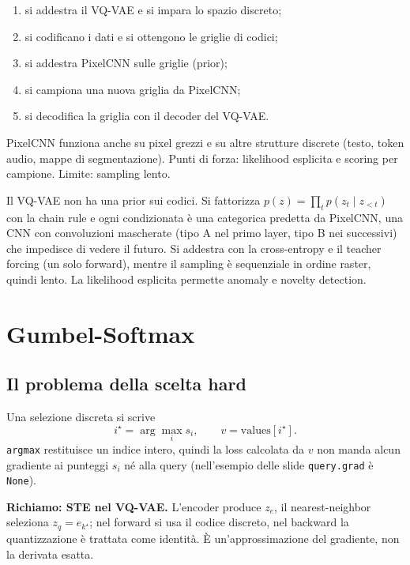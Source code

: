 \documentclass[11pt,a4paper]{article}
\begin{document}
\begin{enumerate}
  \item si addestra il VQ-VAE e si impara lo spazio discreto;
  \item si codificano i dati e si ottengono le griglie di codici;
  \item si addestra PixelCNN sulle griglie (prior);
  \item si campiona una nuova griglia da PixelCNN;
  \item si decodifica la griglia con il decoder del VQ-VAE.
\end{enumerate}

PixelCNN funziona anche su pixel grezzi e su altre strutture discrete (testo, token audio, mappe di segmentazione).
Punti di forza: likelihood esplicita e scoring per campione. Limite: sampling lento.

\begin{importante}
Il VQ-VAE non ha una prior sui codici. Si fattorizza $p(z)=\prod_t p(z_t\mid z_{<t})$ con la chain rule e ogni
condizionata è una categorica predetta da PixelCNN, una CNN con convoluzioni mascherate (tipo A nel primo layer,
tipo B nei successivi) che impedisce di vedere il futuro. Si addestra con la cross-entropy e il teacher forcing
(un solo forward), mentre il sampling è sequenziale in ordine raster, quindi lento. La likelihood esplicita permette anomaly e novelty detection.
\end{importante}

\section{Gumbel-Softmax}

\subsection{Il problema della scelta hard}
Una selezione discreta si scrive
\[
i^\star=\arg\max_i s_i,\qquad v=\mathrm{values}[i^\star].
\]
\texttt{argmax} restituisce un indice intero, quindi la loss calcolata da $v$ non manda alcun gradiente
ai punteggi $s_i$ né alla query (nell'esempio delle slide \texttt{query.grad} è \texttt{None}).

\textbf{Richiamo: STE nel VQ-VAE.} L'encoder produce $z_e$, il nearest-neighbor seleziona $z_q=e_{k^\star}$;
nel forward si usa il codice discreto, nel backward la quantizzazione è trattata come identità.
È un'approssimazione del gradiente, non la derivata esatta.
\end{document}
